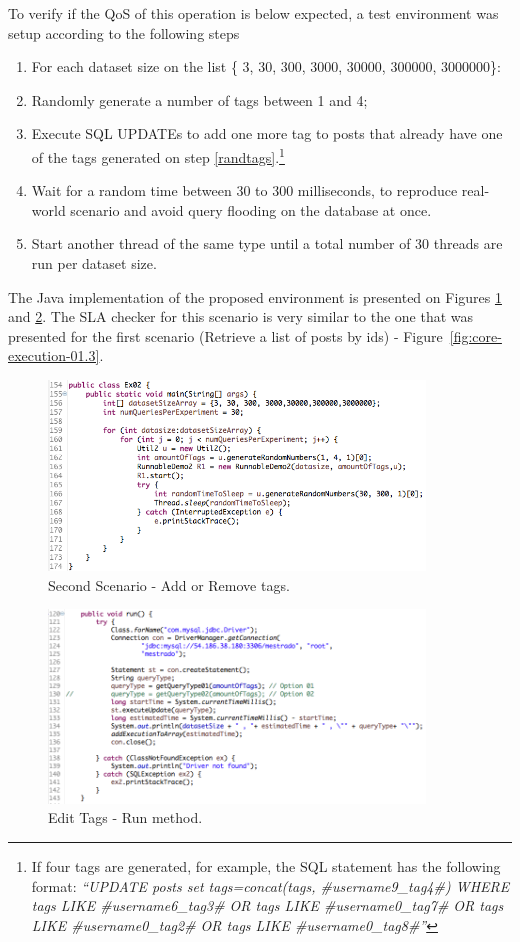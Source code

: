 To verify if the QoS of this operation is below expected, a test environment was setup according to the following steps

\begin{enumerate}
\item{For each dataset size on the list \{ 3, 30, 300, 3000, 30000, 300000, 3000000\}:}
\item{Randomly generate a number of tags between 1 and 4; \label{randtags}}
\item{Execute SQL UPDATEs to add one more tag to posts that already have one of the tags generated on step \ref{randtags}.\footnote{If four tags are generated, for example, the SQL statement has the following format: \textit{``UPDATE posts set tags=concat(tags, \#username9\_tag4\#) WHERE tags LIKE \#username6\_tag3\# OR tags LIKE \#username0\_tag7\# OR tags LIKE \#username0\_tag2\# OR tags LIKE \#username0\_tag8\#''}}}
\item{Wait for a random time between 30 to 300 milliseconds, to reproduce real-world scenario and avoid	query flooding on the database at once.}
\item{Start another thread of the same type until a total number of 30 threads are run per dataset size.}
\end{enumerate}

The Java implementation of the proposed environment is presented on Figures \ref{fig:tags-java-01} and \ref{fig:tags-java-02}. The SLA checker for this scenario is very similar to the one that was presented for the first scenario (Retrieve a list of posts by ids) - Figure~\ref{fig:core-execution-01.3}.


\begin{figure}[ht!]
\centering
\includegraphics[width=100mm]{Imagens/tags-java-01.png}
\caption{Second Scenario - Add or Remove tags.\label{fig:tags-java-01}}
\end{figure}

\begin{figure}[ht!]
\centering
\includegraphics[width=100mm]{Imagens/tags-java-02.png}
\caption{Edit Tags - Run method.\label{fig:tags-java-02}}
\end{figure}

